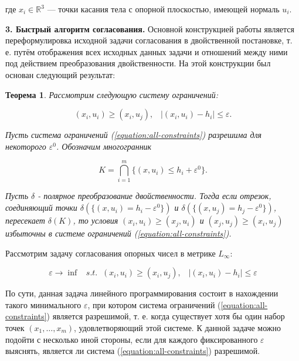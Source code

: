 \documentclass[a4paper, 10pt]{article}
\theoremstyle{definition}
\theoremstyle{plain}
\newtheorem{SmartTheorem}{Теорема}
\theoremstyle{plain}
\begin{document}
где $x_{i} \in \mathbb{R}^{3}$ --- точки касания тела с опорной плоскостью,
имеющей нормаль $u_{i}$.


\textbf{3. Быстрый алгоритм согласования.}
Основной конструкцией работы \cite{palachev} является переформулировка исходной
задачи согласования в двойственной постановке, т. е. путём отображения всех
исходных данных задачи и отношений между ними  под действием преобразования
двойственности. На этой конструкции был основан следующий результат:

\begin{SmartTheorem}\label{theorem:exhaustive-conditions}
Рассмотрим следующую систему ограничений:

\begin{equation}
\label{equation:all-constraints}
 (x_{i}, u_{i}) \geq (x_{i}, u_{j}), \;\;\;
 |(x_{i}, u_{i}) - h_{i}| \leq \varepsilon.
\end{equation}

Пусть система ограничений (\ref{equation:all-constraints}) разрешима
для некоторого $\varepsilon^{0}$. Обозначим многогранник

\begin{equation}
\label{equation:upper-bounds-polyhedron}
 K = \bigcap \limits_{i = 1}^{m}\{(x, u_{i}) \leq h_{i} + \varepsilon^{0}\}.
\end{equation}

Пусть $\delta$ - полярное преобразование двойственности.
Тогда если отрезок, соединяющий точки
$\delta(\{(x, u_{i}) = h_{i} - \varepsilon^{0}\})$ и
$\delta(\{(x, u_{j}) = h_{j} - \varepsilon^{0}\})$, пересекает
$\delta(K)$, то условия $(x_{i}, u_{i}) \geq (x_{j}, u_{i})$ и
$(x_{j}, u_{j}) \geq (x_{i}, u_{j})$ избыточны в системе ограничений
(\ref{equation:all-constraints}).
\end{SmartTheorem}

Рассмотрим задачу согласования опорных чисел в метрике $L_{\infty}$:

\begin{equation}
\label{equation:infinity-problem}
 \varepsilon \to \inf \;\;\;
 s. t. \;\; (x_{i}, u_{i}) \geq (x_{i}, u_{j}), \;\;\;
 |(x_{i}, u_{i}) - h_{i}| \leq \varepsilon
\end{equation}

По сути, данная задача линейного программирования состоит в нахождении такого
минимального $\varepsilon$, при котором система ограничений
(\ref{equation:all-constraints}) является разрешимой, т. е. когда существует
хотя бы один набор точек $(x_{1}, \ldots, x_{m})$, удовлетворяющий этой системе.
К данной задаче можно подойти с несколько иной стороны, если для каждого
фиксированного $\varepsilon$ выяснять, является ли система
(\ref{equation:all-constraints}) разрешимой.
\end{document}
